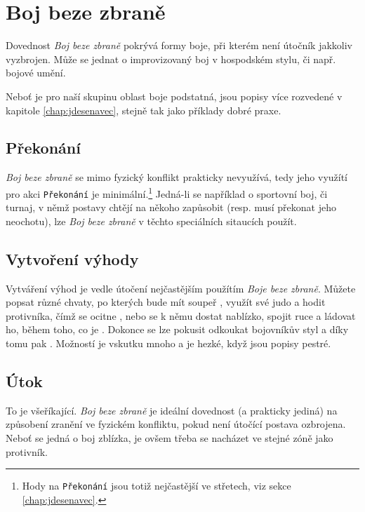 \documentclass[../main.tex]{subfiles}
\begin{document}
\section{Boj beze zbraně}
\label{sec:bojbezezbrane}

Dovednost \textit{Boj beze zbraně} pokrývá formy boje, při kterém není útočník jakkoliv vyzbrojen. Může se jednat o improvizovaný boj v hospodském stylu, či např. bojové umění.

Neboť je pro naší skupinu oblast boje podstatná, jsou popisy více rozvedené v kapitole \ref{chap:jdesenavec}, stejně tak jako příklady dobré praxe.

\subsection*{Překonání}
\label{subsec:boj-prekonani}
\prekonani

\textit{Boj beze zbraně} se mimo fyzický konflikt prakticky nevyužívá, tedy jeho využítí pro akci \texttt{Překonání} je minimální.\footnote{Hody na \texttt{Překonání} jsou totiž nejčastější ve střetech, viz sekce \ref{chap:jdesenavec}.} Jedná-li se například o sportovní boj, či turnaj, v němž postavy chtějí na někoho zapůsobit (resp. musí překonat jeho neochotu), lze \textit{Boj beze zbraně} v těchto speciálních sitaucích použít.

\subsection*{Vytvoření výhody}
\label{subsec:boj-vytvoreni}
\vytvoreni

Vytváření výhod je vedle útočení nejčastějším použítím \textit{Boje beze zbraně}. Můžete popsat různé chvaty, po kterých bude mít soupeř , využít své judo a hodit protivníka, čímž se ocitne , nebo se k němu dostat nablízko, spojit ruce a ládovat ho, během toho, co je . Dokonce se lze pokusit odkoukat bojovníkův styl a díky tomu pak . Možností je vskutku mnoho a je hezké, když jsou popisy pestré.


\subsection*{Útok}
\label{subsec:boj-utok}
\utok

To je všeříkající. \textit{Boj beze zbraně} je ideální dovednost (a prakticky jediná) na způsobení zranění ve fyzickém konfliktu, pokud není útočící postava ozbrojena. Neboť se jedná o boj zblízka, je ovšem třeba se nacházet ve stejné zóně jako protivník.
\end{document}
